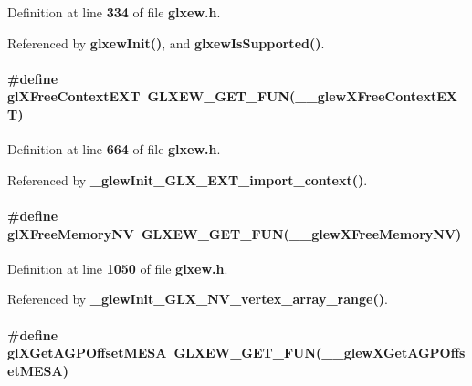 Definition at line {\bf 334} of file {\bf glxew.\+h}.



Referenced by {\bf glxew\+Init()}, and {\bf glxew\+Is\+Supported()}.

\paragraph[{gl\+X\+Free\+Context\+E\+XT}]{\setlength{\rightskip}{0pt plus 5cm}\#define gl\+X\+Free\+Context\+E\+XT~{\bf G\+L\+X\+E\+W\+\_\+\+G\+E\+T\+\_\+\+F\+UN}({\bf \+\_\+\+\_\+glew\+X\+Free\+Context\+E\+XT})}\label{glxew_8h_a830299194df611d5ce20115c436f0988}


Definition at line {\bf 664} of file {\bf glxew.\+h}.



Referenced by {\bf \+\_\+glew\+Init\+\_\+\+G\+L\+X\+\_\+\+E\+X\+T\+\_\+import\+\_\+context()}.

\paragraph[{gl\+X\+Free\+Memory\+NV}]{\setlength{\rightskip}{0pt plus 5cm}\#define gl\+X\+Free\+Memory\+NV~{\bf G\+L\+X\+E\+W\+\_\+\+G\+E\+T\+\_\+\+F\+UN}({\bf \+\_\+\+\_\+glew\+X\+Free\+Memory\+NV})}\label{glxew_8h_a70c04b28dd0e475b9bb758dc7baad0e4}


Definition at line {\bf 1050} of file {\bf glxew.\+h}.



Referenced by {\bf \+\_\+glew\+Init\+\_\+\+G\+L\+X\+\_\+\+N\+V\+\_\+vertex\+\_\+array\+\_\+range()}.

\paragraph[{gl\+X\+Get\+A\+G\+P\+Offset\+M\+E\+SA}]{\setlength{\rightskip}{0pt plus 5cm}\#define gl\+X\+Get\+A\+G\+P\+Offset\+M\+E\+SA~{\bf G\+L\+X\+E\+W\+\_\+\+G\+E\+T\+\_\+\+F\+UN}({\bf \+\_\+\+\_\+glew\+X\+Get\+A\+G\+P\+Offset\+M\+E\+SA})}\label{glxew_8h_aa7836215bbd8d3901efb6abdcb4ed364}


